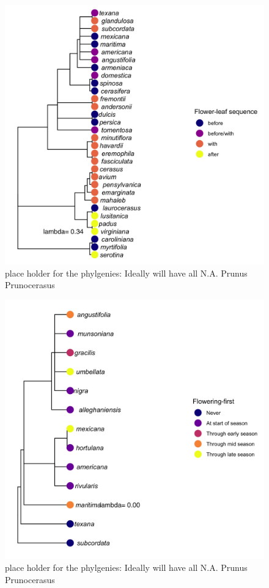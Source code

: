 \documentclass{article}\usepackage[]{graphicx}\usepackage[]{color}
\begin{document}
\begin{figure}[h!]
    \centering
 \includegraphics[width=\textwidth]{..//..//Plots/phylosig1.jpeg}
    \caption{place holder for the phylgenies: Ideally will have all N.A. Prunus  Prunocerasus }
    \label{fig:phylo1}
\end{figure}

\begin{figure}[h!]
    \centering
 \includegraphics[width=\textwidth]{..//..//Plots/phylosig2.jpeg}
    \caption{place holder for the phylgenies: Ideally will have all N.A. Prunus  Prunocerasus }
    \label{fig:phylo2}
\end{figure}
\end{document}
